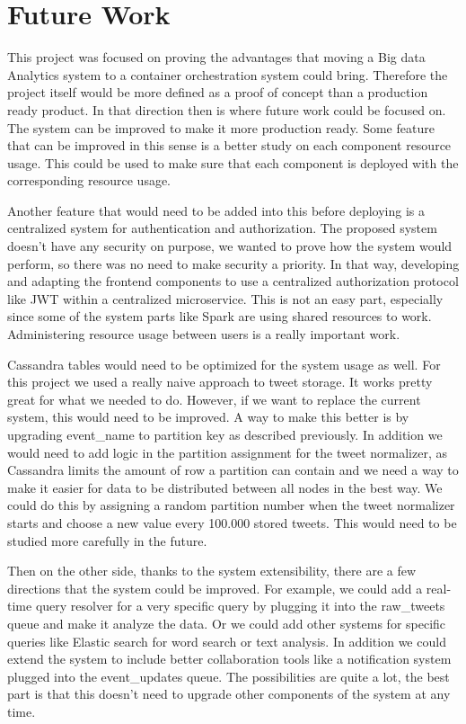 
\chapter{Future Work} %

\label{Chapter9} %

This project was focused on proving the advantages that moving a Big data Analytics system to a container orchestration system could bring. Therefore the project itself would be more defined as a proof of concept than a production ready product. In that direction then is where future work could be focused on. The system can be improved to make it more production ready. Some feature that can be improved in this sense is a better study on each component resource usage. This could be used to make sure that each component is deployed with the corresponding resource usage. 

Another feature that would need to be added into this before deploying is a centralized system for authentication and authorization. The proposed system doesn’t have any security on purpose, we wanted to prove how the system would perform, so there was no need to make security a priority. In that way, developing and adapting the frontend components to use a centralized authorization protocol like JWT within a centralized microservice. This is not an easy part, especially since some of the system parts like Spark are using shared resources to work. Administering resource usage between users is a really important work.

Cassandra tables would need to be optimized for the system usage as well. For this project we used a really naive approach to tweet storage. It works pretty great for what we needed to do. However, if we want to replace the current system, this would need to be improved. A way to make this better is by upgrading event\_name to partition key as described previously. In addition we would need to add logic in the partition assignment for the tweet normalizer, as Cassandra limits the amount of row a partition can contain and we need a way to make it easier for data to be distributed between all nodes in the best way. We could do this by assigning a random partition number when the tweet normalizer starts and choose a new value every 100.000 stored tweets. This would need to be studied more carefully in the future.

Then on the other side, thanks to the system extensibility, there are a few directions that the system could be improved. For example, we could add a real-time query resolver for a very specific query by plugging it into the raw\_tweets queue and make it analyze the data. Or we could add other systems for specific queries like Elastic search for word search or text analysis. In addition we could extend the system to include better collaboration tools like a notification system plugged into the event\_updates queue. The possibilities are quite a lot, the best part is that this doesn’t need to upgrade other components of the system at any time.
